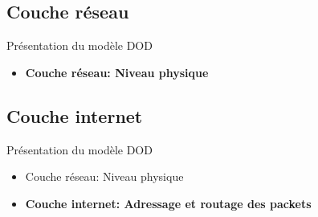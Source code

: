 \begin{frame}\frametitle{}
    \subsection{Couche réseau}
    {\Huge Présentation du modèle DOD}

    \begin{itemize}
        \item \textbf{{\Large Couche réseau}: Niveau physique}
    \end{itemize}
     

\end{frame}


\begin{frame}\frametitle{}
    \subsection{Couche internet}
    {\Huge Présentation du modèle DOD}

    \begin{itemize}
        \item {\Large Couche réseau}: Niveau physique
        \item \textbf{{\Large Couche internet}: Adressage et routage des packets}
    \end{itemize}


\end{frame}





